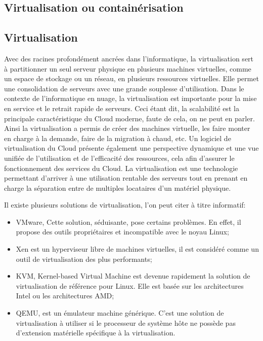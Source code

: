 \begin{onehalfspace}
\section{Virtualisation ou containérisation}

\subsection{Virtualisation}

Avec des racines profondément ancrées dans l'informatique, la virtualisation sert à partitionner un seul serveur physique en plusieurs machines virtuelles, comme un espace de stockage ou un réseau, en plusieurs ressources virtuelles. Elle permet une consolidation de serveurs avec une grande souplesse d'utilisation. Dans le contexte de l'informatique en nuage, la virtualisation est importante pour la mise en service et le retrait rapide de serveurs. Ceci étant dit, la scalabilité est la principale caractéristique du Cloud moderne, faute de cela, on ne peut en parler. Ainsi la virtualisation a permis de créer des machines virtuelle, les faire monter en charge à la demande, faire de la migration à chaud, etc. Un logiciel de virtualisation du Cloud présente également une perspective dynamique et une vue unifiée de l'utilisation et de l'efficacité des ressources, cela afin d'assurer le fonctionnement des services du Cloud. La virtualisation est une technologie permettant d'arriver à une utilisation rentable des serveurs tout en prenant en charge la séparation entre de multiples locataires d'un matériel physique.

Il existe plusieurs solutions de virtualisation, l'on peut citer à titre informatif:

\begin{itemize}
\item VMware, Cette solution, séduisante, pose certains problèmes. En effet, il propose des outils propriétaires et incompatible avec le noyau Linux;
\item Xen est un hyperviseur libre de machines virtuelles, il est considéré comme un outil de virtualisation des plus performants;
\item KVM, Kernel-based Virtual Machine est devenue rapidement la solution de virtualisation de référence pour Linux. Elle est basée sur les architectures Intel ou les architectures AMD;
\item QEMU, est un émulateur machine générique. C'est une solution de virtualisation à utiliser si le processeur de système hôte ne possède pas d'extension matérielle spécifique à la virtualisation.


\end{itemize}
\end{onehalfspace}
